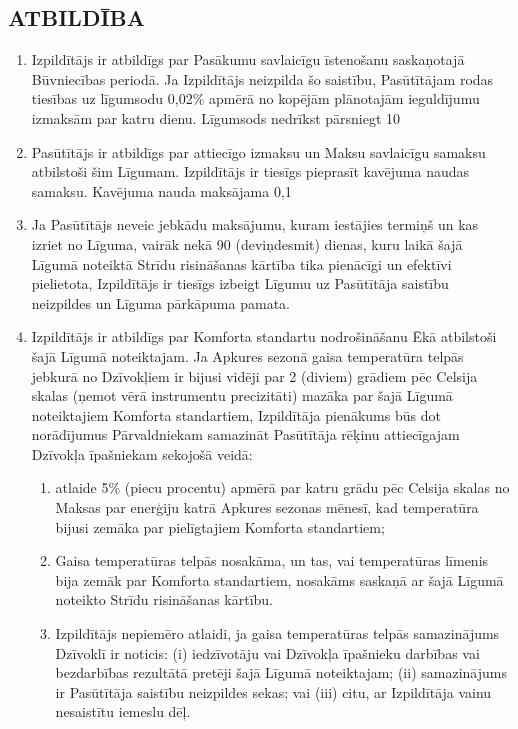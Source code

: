 \begin{multicols}{2}
\subsection{ATBILDĪBA}
\begin{enumerate}
	\item Izpildītājs ir atbildīgs par Pasākumu savlaicīgu īstenošanu saskaņotajā Būvniecības periodā. Ja Izpildītājs neizpilda šo saistību, Pasūtītājam rodas tiesības uz līgumsodu 0,02\% apmērā no kopējām plānotajām ieguldījumu izmaksām par katru dienu. Līgumsods nedrīkst pārsniegt 10%
	\item Pasūtītājs ir atbildīgs par attiecīgo izmaksu un Maksu savlaicīgu samaksu atbilstoši šim Līgumam. Izpildītājs ir tiesīgs pieprasīt kavējuma naudas samaksu. Kavējuma nauda maksājama 0,1%
	\item Ja Pasūtītājs neveic jebkādu maksājumu, kuram iestājies termiņš un kas izriet no Līguma, vairāk nekā 90 (deviņdesmit) dienas, kuru laikā šajā Līgumā noteiktā Strīdu risināšanas kārtība tika pienācīgi un efektīvi pielietota, Izpildītājs ir tiesīgs izbeigt Līgumu uz Pasūtītāja saistību neizpildes un Līguma pārkāpuma pamata.
	\item Izpildītājs ir atbildīgs par Komforta standartu nodrošināšanu Ēkā atbilstoši šajā Līgumā noteiktajam. Ja Apkures sezonā gaisa temperatūra telpās jebkurā no Dzīvokļiem ir bijusi vidēji par 2 (diviem) grādiem pēc Celsija skalas (ņemot vērā instrumentu precizitāti) mazāka par šajā Līgumā noteiktajiem Komforta standartiem, Izpildītāja pienākums būs dot norādījumus Pārvaldniekam samazināt Pasūtītāja rēķinu attiecīgajam Dzīvokļa īpašniekam sekojošā veidā:
	\begin{enumerate}
		\item atlaide 5\% (piecu procentu) apmērā par katru grādu pēc Celsija skalas no Maksas par enerģiju katrā Apkures sezonas mēnesī, kad temperatūra bijusi zemāka par pielīgtajiem Komforta standartiem;
		\item Gaisa temperatūras telpās nosakāma, un tas, vai temperatūras līmenis bija zemāk par Komforta standartiem, nosakāms saskaņā ar šajā Līgumā noteikto Strīdu risināšanas kārtību.
		\item Izpildītājs nepiemēro atlaidi, ja gaisa temperatūras telpās samazinājums Dzīvoklī ir noticis: (i) iedzīvotāju vai Dzīvokļa īpašnieku darbības vai bezdarbības rezultātā pretēji šajā Līgumā noteiktajam; (ii) samazinājums ir Pasūtītāja saistību neizpildes sekas; vai (iii) citu, ar Izpildītāja vainu nesaistītu iemeslu dēļ.

\end{enumerate}
\end{enumerate}
\end{multicols}
